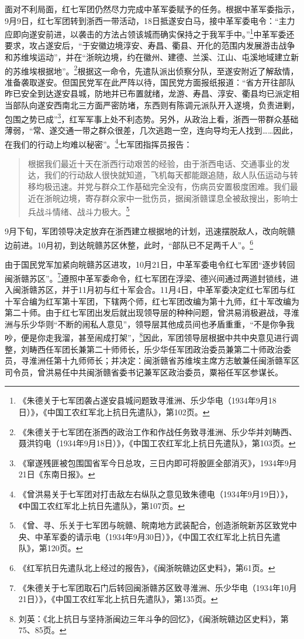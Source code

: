 面对不利局面，红七军团仍然尽力完成中革军委赋予的任务。根据中革军委指示，9月9日，红七军团转到浙西一带活动，18日抵遂安白马，接中革军委电令：“主力应即向遂安前进，以袭击的方法占领该城而确实保持之于我军手中。”\footnote{《朱德关于七军团袭占遂安县城问题致寻淮洲、乐少华电（1934年9月18日）》，《中国工农红军北上抗日先遣队》，第102页。}中革军委还要求，攻占遂安后，“于安徽边境淳安、寿昌、衢县、开化的范围内发展游击战争和苏维埃运动”，并在“浙皖边境，约在徽州、建德、兰溪、江山、屯溪地域建立新的苏维埃根据地”。\footnote{《朱德关于七军团在浙西的政治工作和作战任务致寻淮洲、乐少华并刘畴西、聂洪钧电（1934年9月18日）》，《中国工农红军北上抗日先遣队》，第103页。}根据这一命令，先遣队派出侦察分队，至遂安附近了解敌情，准备袭取遂安。但国民党军在此严阵以待，国民党方面报纸报道：“省方开往部队昨已安全到达遂安县城，防地并已布置就绪，龙游、寿昌、淳安、衢县均已派定相当部队向遂安西南北三方面严密防堵，东西则有陈调元派队开入遂境，负责进剿，包围之势已成”\footnote{《窜遂残匪被包围国省军今日总攻，三日内即可将股匪全部消灭》，1934年9月21日《东南日报》。}，红军军事上处不利态势。另外，从政治上看，浙西一带群众基础薄弱，“常、遂交通一带之群众很差，几次逃跑一空，连向导均无人找到……因此，在我们的行动上均难以秘密”。\footnote{《曾洪易关于七军团对打击敌左右纵队之意见致朱德电（1934年9月19日）》，《中国工农红军北上抗日先遣队》，第107页。}七军团指挥员报告：

\begin{quote}

根据我们最近十天在浙西行动艰苦的经验，由于浙西电话、交通事业的发达，我们的行动敌人很快就知道，飞机每天都能跟追随，敌人队伍运动与转移均极迅速。并党与群众工作基础完全没有，伤病员安置极度困难。我们最近在浙皖边境，寄存群众家中一批伤员，据闽浙赣谍息全被敌搜出，影响士兵战斗情绪、战斗力极大。\footnote{《曾、寻、乐关于七军团与皖赣、皖南地方武装配合，创造浙皖新苏区致党中央、中革军委的请示电（1934年9月30日）》，《中国工农红军北上抗日先遣队》，第120页。}
\end{quote}


9月下旬，军团领导决定放弃在浙西建立根据地的计划，迅速摆脱敌人，改向皖赣边前进。10月初，到达皖赣苏区休整，此时，“部队已不足两千人”。\footnote{《红军抗日先遣队北上经过的报告》，《闽浙皖赣边区史料》，第61页。}


由于国民党军加紧向皖赣苏区进攻，10月21日，中革军委电令红七军团“逐步转回闽浙赣苏区”。\footnote{《朱德关于七军团取石门后转回闽浙赣苏区致寻淮洲、乐少华电（1934年10月21日）》，《中国工农红军北上抗日先遣队》，第135页。}遵照中革军委命令，红七军团在浮梁、德兴间通过两道封锁线，进入闽浙赣苏区，并于11月初与红十军会合。11月4日，中革军委决定红七军团与红十军合编为红军第十军团，下辖两个师，红七军团改编为第十九师，红十军改编为第二十师。由于红七军团出发后就出现领导层的种种问题，曾洪易消极避战，寻淮洲与乐少华则“不断的闹私人意见”，领导层其他成员间也矛盾重重，“不是你争我吵，便是你走我溜，甚至闹成打架”，\footnote{刘英：《北上抗日与坚持浙闽边三年斗争的回忆》，《闽浙皖赣边区史料》，第75、85页。}因此，军团领导层根据中共中央意见进行调整，刘畴西任军团长兼第二十师师长，乐少华任军团政治委员兼第二十师政治委员，寻淮洲任第十九师师长；并决定：闽浙赣省苏维埃主席方志敏兼任闽浙赣军区司令员，曾洪易任中共闽浙赣省委书记兼军区政治委员，粟裕任军区参谋长。


